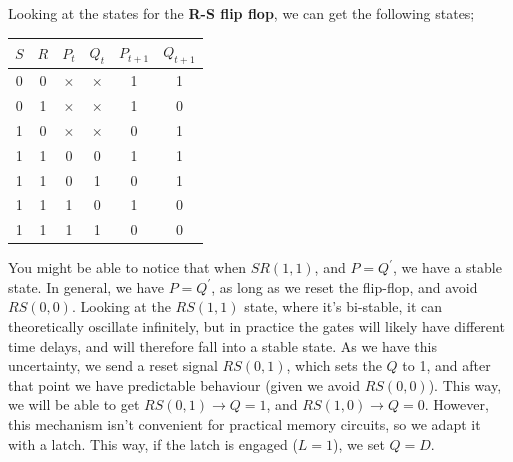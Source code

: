 \documentclass[a4paper, 12pt]{article}
\begin{document}
            Looking at the states for the \textbf{R-S flip flop}, we can get the following states;
            \begin{center}
                \begin{tabular}{c|c||c|c|c|c}
                    $S$ & $R$ & $P_t$ & $Q_t$ & $P_{t+1}$ & $Q_{t+1}$ \\
                    \hline
                    0 & 0 & $\times$ & $\times$ & 1 & 1 \\
                    0 & 1 & $\times$ & $\times$ & 1 & 0 \\
                    1 & 0 & $\times$ & $\times$ & 0 & 1 \\
                    1 & 1 & 0 & 0 & 1 & 1 \\
                    1 & 1 & 0 & 1 & 0 & 1 \\
                    1 & 1 & 1 & 0 & 1 & 0 \\
                    1 & 1 & 1 & 1 & 0 & 0
                \end{tabular}
            \end{center}
            You might be able to notice that when $SR(1, 1)$, and $P = Q^\prime$, we have a stable state. In general, we have $P = Q^\prime$, as long as we reset the flip-flop, and avoid $RS(0, 0)$. Looking at the $RS(1, 1)$ state, where it's bi-stable, it can theoretically oscillate infinitely, but in practice the gates will likely have different time delays, and will therefore fall into a stable state. As we have this uncertainty, we send a reset signal $RS(0, 1)$, which sets the $Q$ to 1, and after that point we have predictable behaviour (given we avoid $RS(0, 0)$). This way, we will be able to get $RS(0, 1) \to Q = 1$, and $RS(1, 0) \to Q = 0$. However, this mechanism isn't convenient for practical memory circuits, so we adapt it with a latch. This way, if the latch is engaged ($L = 1$), we set $Q = D$.
\end{document}
